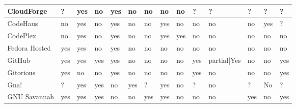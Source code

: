 \begin{landscape}
\begin{table}[H]
{\begin{tabular}{|l|l|l|l|l|l|l|l|l|l|l|l|l|l|}
            \hline CloudForge & ? & yes \cellcolor{green} & no \cellcolor{red} & yes \cellcolor{green} & no \cellcolor{red} & no \cellcolor{red} & no \cellcolor{red} & no \cellcolor{red} & ?    & ? & ? & ? & ?\\

            \hline CodeHaus & no \cellcolor{red} & yes \cellcolor{green} & no \cellcolor{red} & yes \cellcolor{green} & no \cellcolor{red} & no \cellcolor{red} & yes \cellcolor{green} & no \cellcolor{red} & no \cellcolor{red} & no \cellcolor{red} & no \cellcolor{red} & yes \cellcolor{green} & ?\\

            \hline CodePlex & no \cellcolor{red} & yes \cellcolor{green} & no \cellcolor{red} & yes \cellcolor{green} & no \cellcolor{red} & no \cellcolor{red} & yes \cellcolor{green} & yes \cellcolor{green} & no \cellcolor{red} & no \cellcolor{red} & no \cellcolor{red} & no \cellcolor{red} & no \cellcolor{red}\\

            \hline Fedora Hosted & yes \cellcolor{green} & yes \cellcolor{green} & no \cellcolor{red} & yes \cellcolor{green} & no \cellcolor{red} & no \cellcolor{red} & no \cellcolor{red} & no \cellcolor{red} & no \cellcolor{red} & no \cellcolor{red} & no \cellcolor{red} & no \cellcolor{red} & no \cellcolor{red}\\

            \hline GitHub & yes \cellcolor{green} & yes \cellcolor{green} & yes \cellcolor{green} & yes \cellcolor{green} & no \cellcolor{red} & no \cellcolor{red} & no \cellcolor{red} & no \cellcolor{red} & yes \cellcolor{green} & partial|Yes \cellcolor{yellow} & no \cellcolor{red} & no \cellcolor{red} & yes \cellcolor{green}\\

            \hline Gitorious & yes \cellcolor{green} & no \cellcolor{red} & no \cellcolor{red} & yes \cellcolor{green} & no \cellcolor{red} & no \cellcolor{red} & no \cellcolor{red} & no \cellcolor{red} & yes \cellcolor{green} & no \cellcolor{red} & no \cellcolor{red} & no \cellcolor{red} & yes \cellcolor{green}\\

            \hline Gna! & ?& yes \cellcolor{green}& yes \cellcolor{green} & no \cellcolor{red} & yes \cellcolor{green}& ?& yes \cellcolor{green}& no \cellcolor{red}& ?& no \cellcolor{red}& ?& No& ?\\ 

            \hline GNU Savannah & yes \cellcolor{green} & yes \cellcolor{green} & yes \cellcolor{green} & no \cellcolor{red} & no \cellcolor{red} & yes \cellcolor{green} & yes \cellcolor{green} & no \cellcolor{red} & no \cellcolor{red} & no \cellcolor{red} & yes \cellcolor{green} & no \cellcolor{red} & yes \cellcolor{green}\\


\end{tabular}}
\end{table}
\end{landscape}
